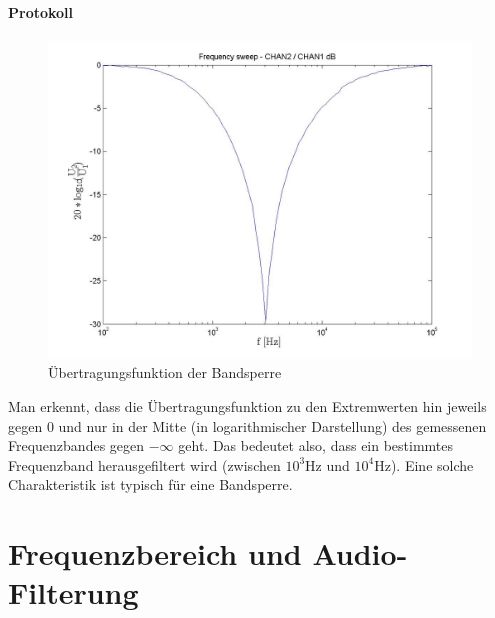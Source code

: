 \documentclass[10pt]{scrreprt}
\begin{document}
    \paragraph{Protokoll}
    \begin{center}
        \begin{figure}[H]
            \includegraphics[width=\textwidth]{FS_54_frequencysweep_ylogxlog.jpg}
            \caption{Übertragungsfunktion der Bandsperre}
        \end{figure}
    \end{center}
    Man erkennt, dass die Übertragungsfunktion zu den Extremwerten hin jeweils
    gegen 0 und nur in der Mitte (in logarithmischer Darstellung)
    des gemessenen Frequenzbandes  gegen $-\infty$ geht. Das bedeutet also, dass
    ein bestimmtes Frequenzband herausgefiltert wird (zwischen $10^3\si{\hertz}$
    und $10^4\si{\hertz}$). Eine solche Charakteristik ist typisch für eine
    Bandsperre.


    \section{Frequenzbereich und Audio-Filterung}
\end{document}
